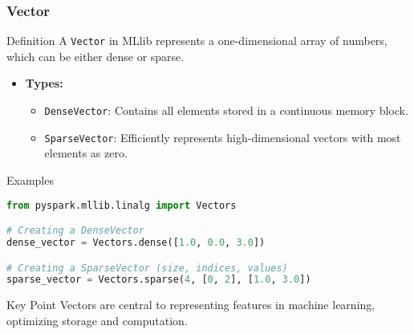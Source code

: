 \documentclass[aspectratio=169]{beamer}
\begin{document}
\begin{frame}[fragile]
    \frametitle{Vector}
    \begin{block}{Definition}
        A \texttt{Vector} in MLlib represents a one-dimensional array of numbers, which can be either dense or sparse.
    \end{block}

    \begin{itemize}
        \item \textbf{Types:}
        \begin{itemize}
            \item \texttt{DenseVector}: Contains all elements stored in a continuous memory block.
            \item \texttt{SparseVector}: Efficiently represents high-dimensional vectors with most elements as zero.
        \end{itemize}
    \end{itemize}

    \begin{block}{Examples}
    \begin{lstlisting}[language=Python]
from pyspark.mllib.linalg import Vectors

# Creating a DenseVector
dense_vector = Vectors.dense([1.0, 0.0, 3.0])

# Creating a SparseVector (size, indices, values)
sparse_vector = Vectors.sparse(4, [0, 2], [1.0, 3.0])
    \end{lstlisting}
    \end{block}
    
    \begin{block}{Key Point}
        Vectors are central to representing features in machine learning, optimizing storage and computation.
    \end{block}
\end{frame}
\end{document}
